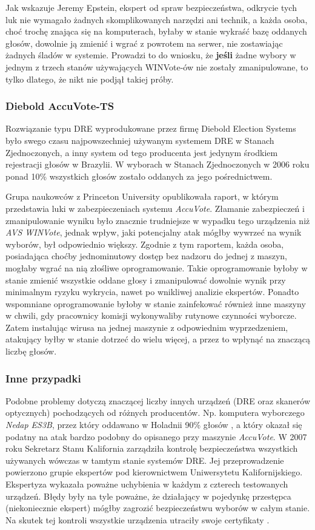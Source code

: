 \documentclass[polish]{kbk}
\begin{document}
Jak wskazuje Jeremy Epstein, ekspert od spraw bezpieczeństwa, odkrycie tych luk nie wymagało żadnych skomplikowanych narzędzi ani technik, a każda osoba, choć trochę znająca się na komputerach, byłaby w stanie wykraść bazę oddanych głosów, dowolnie ją zmienić i wgrać z powrotem na serwer, nie zostawiając żadnych śladów w systemie. Prowadzi to do wniosku, że \textbf{jeśli} żadne wybory w jednym z trzech stanów używających WINVote-ów nie zostały zmanipulowane, to tylko dlatego, że nikt nie podjął takiej próby.

\subsubsection{Diebold AccuVote-TS \cite{accuvote-ts}}
Rozwiązanie typu DRE wyprodukowane przez firmę Diebold Election Systems było swego czasu najpowszechniej używanym systemem DRE w Stanach Zjednoczonych, a inny system od tego producenta jest jedynym środkiem rejestracji głosów w Brazylii. W wyborach w Stanach Zjednoczonych w 2006 roku ponad 10\% wszystkich głosów zostało oddanych za jego pośrednictwem. 

Grupa naukowców z Princeton University opublikowała raport, w którym przedstawia luki w zabezpieczeniach systemu \textit{AccuVote}. Złamanie zabezpieczeń i zmanipulowanie wyniku było znacznie trudniejsze w wypadku tego urządzenia niż \textit{AVS WINVote}, jednak wpływ, jaki potencjalny atak mógłby wywrzeć na wynik wyborów, był odpowiednio większy. Zgodnie z tym raportem, każda osoba, posiadająca choćby jednominutowy dostęp bez nadzoru do jednej z maszyn, mogłaby wgrać na nią złośliwe oprogramowanie. Takie oprogramowanie byłoby w stanie zmienić wszystkie oddane głosy i zmanipulować dowolnie wynik przy minimalnym ryzyku wykrycia, nawet po wnikliwej analizie ekspertów. Ponadto wspomniane oprogramowanie byłoby w stanie zainfekować również inne maszyny w chwili, gdy pracownicy komisji wykonywaliby rutynowe czynności wyborcze. Zatem instalując wirusa na jednej maszynie z odpowiednim wyprzedzeniem, atakujący byłby w stanie dotrzeć do wielu więcej, a przez to wpłynąć na znaczącą liczbę głosów.

\subsubsection{Inne przypadki}
Podobne problemy dotyczą znaczącej liczby innych urządzeń (DRE oraz skanerów optycznych) pochodzących od różnych producentów. Np. komputera wyborczego \textit{Nedap ES3B}, przez który oddawano w Holadnii 90\% głosów \cite{nedap}, a który okazał się podatny na atak bardzo podobny do opisanego przy maszynie \textit{AccuVote}. W 2007 roku Sekretarz Stanu Kalifornia zarządziła kontrolę bezpieczeństwa wszystkich używanych wówczas w tamtym stanie systemów DRE. Jej przeprowadzenie powierzono grupie ekspertów pod kierownictwem Uniwersytetu Kalifornijskiego. Ekspertyza wykazała poważne uchybienia w każdym z czterech testowanych urządzeń. Błędy były na tyle poważne, że działający w pojedynkę przestępca (niekoniecznie ekspert) mógłby zagrozić bezpieczeństwu wyborów w całym stanie. Na skutek tej kontroli wszystkie urządzenia utraciły swoje certyfikaty \cite{california}.
\end{document}
